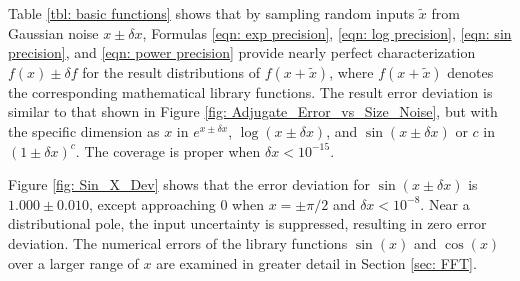 \documentclass[twoside]{article}
\numberwithin{equation}{section}
\begin{document}
\begin{table}
\centering
{}
\label{tbl: basic functions}
\end{table}


Table \ref{tbl: basic functions} shows that by sampling random inputs $\tilde{x}$ from Gaussian noise $x \pm \delta x$, Formulas \eqref{eqn: exp precision}, \eqref{eqn: log precision}, \eqref{eqn: sin precision}, and \eqref{eqn: power precision} provide nearly perfect characterization $f(x) \pm \delta f$ for the result distributions of $f(x+\tilde{x})$, where $f(x+\tilde{x})$ denotes the corresponding mathematical library functions.
The result error deviation is similar to that shown in Figure \ref{fig: Adjugate_Error_vs_Size_Noise}, but with the specific dimension as $x$ in $e^{x \pm \delta x}$, $\log(x \pm \delta x)$, and $\sin(x \pm \delta x)$ or $c$ in $(1 \pm \delta x)^c$.
The coverage is proper when $\delta x < 10^{-15}$.

Figure \ref{fig: Sin_X_Dev} shows that the error deviation for $\sin(x \pm \delta x)$ is $1.000 \pm 0.010$, except approaching $0$ when $x=\pm \pi/2$ and $\delta x < 10^{-8}$.
Near a distributional pole, the input uncertainty is suppressed, resulting in zero error deviation.
The numerical errors of the library functions $\sin(x)$ and $\cos(x)$ over a larger range of $x$ are examined in greater detail in Section \ref{sec: FFT}.
\end{document}
